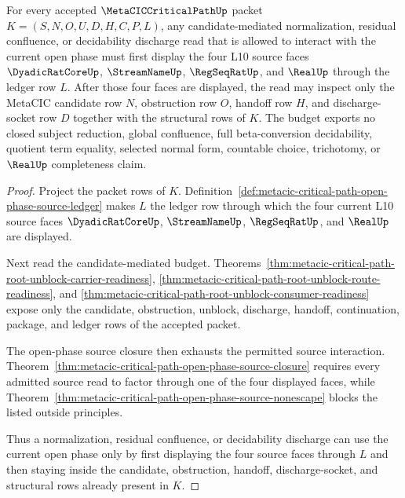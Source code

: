 \begin{theorem}
\label{thm:metacic-critical-path-open-phase-source-ledger-discharge-budget}
For every accepted $\MetaCICCriticalPathUp$ packet $K=(S,N,O,U,D,H,C,P,L)$, any candidate-mediated normalization, residual confluence, or decidability discharge read that is allowed to interact with the current open phase must first display the four L10 source faces $\DyadicRatCoreUp$, $\StreamNameUp$, $\RegSeqRatUp$, and $\RealUp$ through the ledger row $L$. After those four faces are displayed, the read may inspect only the MetaCIC candidate row $N$, obstruction row $O$, handoff row $H$, and discharge-socket row $D$ together with the structural rows of $K$. The budget exports no closed subject reduction, global confluence, full beta-conversion decidability, quotient term equality, selected normal form, countable choice, trichotomy, or $\RealUp$ completeness claim.
\end{theorem}
\begin{proof}
Project the packet rows of $K$. Definition~\ref{def:metacic-critical-path-open-phase-source-ledger} makes $L$ the ledger row through which the four current L10 source faces $\DyadicRatCoreUp$, $\StreamNameUp$, $\RegSeqRatUp$, and $\RealUp$ are displayed.

Next read the candidate-mediated budget. Theorems~\ref{thm:metacic-critical-path-root-unblock-carrier-readiness}, \ref{thm:metacic-critical-path-root-unblock-route-readiness}, and \ref{thm:metacic-critical-path-root-unblock-consumer-readiness} expose only the candidate, obstruction, unblock, discharge, handoff, continuation, package, and ledger rows of the accepted packet.

The open-phase source closure then exhausts the permitted source interaction. Theorem~\ref{thm:metacic-critical-path-open-phase-source-closure} requires every admitted source read to factor through one of the four displayed faces, while Theorem~\ref{thm:metacic-critical-path-open-phase-source-nonescape} blocks the listed outside principles.

Thus a normalization, residual confluence, or decidability discharge can use the current open phase only by first displaying the four source faces through $L$ and then staying inside the candidate, obstruction, handoff, discharge-socket, and structural rows already present in $K$.
\end{proof}

